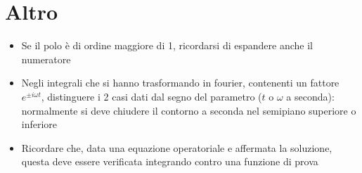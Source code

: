 \documentclass[12pt,a4paper]{article}
\begin{document}
\section{Altro}

\begin{itemize}
	\item Se il polo è di ordine maggiore di 1, ricordarsi di espandere anche il numeratore
	\item Negli integrali che si hanno trasformando in fourier, contenenti un fattore $e^{\pm i\omega t}$, distinguere i 2 casi dati dal segno del parametro ($t$ o $\omega$ a seconda): normalmente si deve chiudere il contorno a seconda nel semipiano superiore o inferiore
	\item Ricordare che, data una equazione operatoriale e affermata la soluzione, questa deve essere verificata integrando contro una funzione di prova
\end{itemize}
\end{document}
